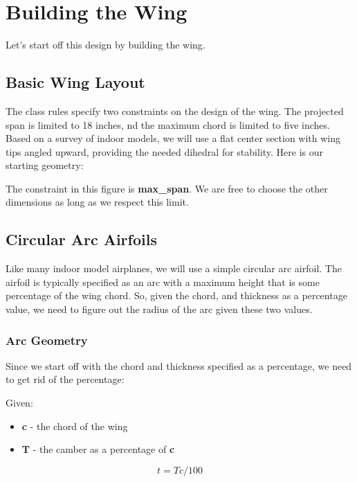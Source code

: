 \section*{Building the Wing}

Let's start off this design by building the wing.

\subsection*{Basic Wing Layout}

The class rules specify two constraints on the design of the wing. The
projected span is limited to 18 inches, nd the maximum chord is limited to five
inches. Based on a survey of indoor models, we will use a flat center section
with wing tips angled upward, providing the needed dihedral for stability. Here
is our starting geometry:



The constraint in this figure is {\bf max\_span}. We are free to choose the
other dimensions as long as we respect this limit.

\subsection*{Circular Arc Airfoils}

Like many indoor model airplanes, we will use a simple circular arc airfoil.
The airfoil is typically specified as an arc with a maximum height that is some
percentage of the wing chord.  So, given the chord, and thickness as a
percentage value, we need to figure out the radius of the arc given these two
values.

\subsubsection*{Arc Geometry}

Since we start off with the chord and thickness specified as a percentage, we
need to get rid of the percentage:

Given:

\begin{itemize}
  \item{{\bf c} - the chord of the wing}
  \item{{\bf T} - the camber as a percentage of {\bf c}}
\end{itemize}

\begin{equation}
    t =  T c / 100
\end{equation}

